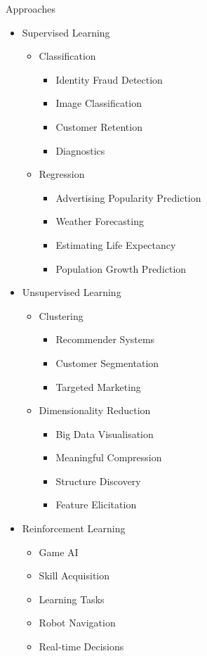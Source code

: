 \documentclass{beamer}
\begin{document}
\begin{frame}{Approaches}
\begin{multicols}{2}
\begin{itemize}
\item Supervised Learning
	\begin{itemize}
    \item Classification
    	\begin{itemize}
        \item Identity Fraud Detection
        \item Image Classification
        \item Customer Retention
        \item Diagnostics
        \end{itemize}
    \item Regression
    	\begin{itemize}
        \item Advertising Popularity Prediction
        \item Weather Forecasting
        \item Estimating Life Expectancy
        \item Population Growth Prediction
        \end{itemize}
    \end{itemize}
\item Unsupervised Learning
	\begin{itemize}
    \item Clustering
    	\begin{itemize}
        \item Recommender Systems
        \item Customer Segmentation
        \item Targeted Marketing
        \end{itemize}
    \item Dimensionality Reduction
    	\begin{itemize}
        \item Big Data Visualisation
        \item Meaningful Compression
        \item Structure Discovery
        \item Feature Elicitation
        \end{itemize}
    \end{itemize}
\item Reinforcement Learning
	\begin{itemize}
    \item Game AI
    \item Skill Acquisition
    \item Learning Tasks
    \item Robot Navigation
    \item Real-time Decisions
    \end{itemize}
\end{itemize}
\end{multicols}
\end{frame}
\end{document}
